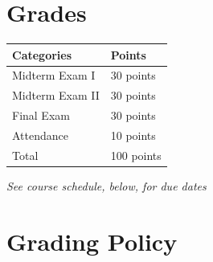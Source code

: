 \documentclass[12pt]{article}
\begin{document}
\newpage

\section*{Grades}

\newlength\q
\setlength{}
\begin{tabular}{|p{\q}|p{\q}|}
    \hline
    Categories  & Points \\
    \hline
    \hline
    Midterm Exam I & 30 points \\
    \hline
    Midterm Exam II & 30 points \\
    \hline
    Final Exam & 30 points \\
    \hline
    Attendance & 10 points \\
    \hline
    Total & 100 points \\
    \hline
\end{tabular}
\textit{See course schedule, below, for due dates} \\


\section*{Grading Policy}


\end{document}

